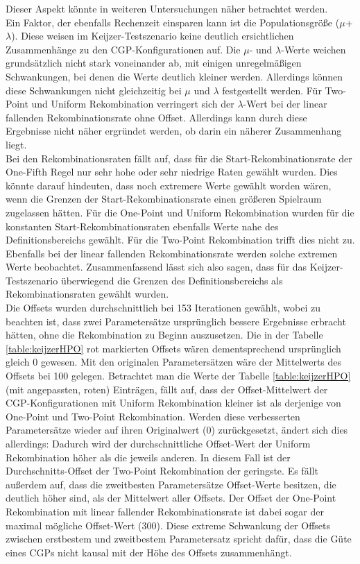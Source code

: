 Dieser Aspekt könnte in weiteren Untersuchungen näher betrachtet werden.\\
Ein Faktor, der ebenfalls Rechenzeit einsparen kann ist die Populationsgröße ($\mu$+$\lambda$).
Diese weisen im Keijzer-Testszenario keine deutlich ersichtlichen Zusammenhänge zu den CGP-Konfigurationen auf.
Die $\mu$- und $\lambda$-Werte weichen grundsätzlich nicht stark voneinander ab, mit einigen unregelmäßigen Schwankungen, bei denen die Werte deutlich kleiner werden.
Allerdings können diese Schwankungen nicht gleichzeitig bei $\mu$ und $\lambda$ festgestellt werden.
Für Two-Point und Uniform Rekombination verringert sich der $\lambda$-Wert bei der linear fallenden Rekombinationsrate ohne Offset.
Allerdings kann durch diese Ergebnisse nicht näher ergründet werden, ob darin ein näherer Zusammenhang liegt.\\
Bei den Rekombinationsraten fällt auf, dass für die Start-Rekombinationsrate der One-Fifth Regel nur sehr hohe oder sehr niedrige Raten gewählt wurden.
Dies könnte darauf hindeuten, dass noch extremere Werte gewählt worden wären, wenn die Grenzen der Start-Rekombinationsrate einen größeren Spielraum zugelassen hätten.
Für die One-Point und Uniform Rekombination wurden für die konstanten Start-Rekombinationsraten ebenfalls Werte nahe des Definitionsbereichs gewählt.
Für die Two-Point Rekombination trifft dies nicht zu.
Ebenfalls bei der linear fallenden Rekombinationsrate werden solche extremen Werte beobachtet.
Zusammenfassend lässt sich also sagen, dass für das Keijzer-Testszenario überwiegend die Grenzen des Definitionsbereichs als Rekombinationsraten gewählt wurden.\\
Die Offsets wurden durchschnittlich bei 153 Iterationen gewählt, wobei zu beachten ist, dass zwei Parametersätze ursprünglich bessere Ergebnisse erbracht hätten, ohne die Rekombination zu Beginn auszusetzen.
Die in der Tabelle \ref{table:keijzerHPO} rot markierten Offsets wären dementsprechend ursprünglich gleich 0 gewesen.
Mit den originalen Parametersätzen wäre der Mittelwerts des Offsets bei 100 gelegen.
Betrachtet man die Werte der Tabelle \ref{table:keijzerHPO} (mit angepassten, roten) Einträgen, fällt auf, dass der Offset-Mittelwert der CGP-Konfigurationen mit Uniform Rekombination kleiner ist als derjenige von One-Point und Two-Point Rekombination.
Werden diese verbesserten Parametersätze wieder auf ihren Originalwert (0) zurückgesetzt, ändert sich dies allerdings: Dadurch wird der durchschnittliche Offset-Wert der Uniform Rekombination höher als die jeweils anderen.
In diesem Fall ist der Durchschnitts-Offset der Two-Point Rekombination der geringste.
Es fällt außerdem auf, dass die zweitbesten Parametersätze Offset-Werte besitzen, die deutlich höher sind, als der Mittelwert aller Offsets.
Der Offset der One-Point Rekombination mit linear fallender Rekombinationsrate ist dabei sogar der maximal mögliche Offset-Wert (300).
Diese extreme Schwankung der Offsets zwischen erstbestem und zweitbestem Parametersatz spricht dafür, dass die Güte eines CGPs nicht kausal mit der Höhe des Offsets zusammenhängt.

